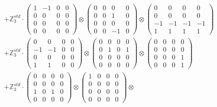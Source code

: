 \documentclass{article}
\begin{document}
{\begin{align}
        &+ \label{Rs1-Rc16-Solution-1-c4} \mathbb{Z}_3^{std} \cdot 
            \begin{pmatrix} 1 & -1 & 0 & 0 \\ 0 & 0 & 0 & 0 \\ 0 & 0 & 0 & 0 \\ 0 & 0 & 0 & 0 \end{pmatrix} \otimes 
            \begin{pmatrix} 0 & 0 & 0 & 0 \\ 0 & 0 & 1 & 0 \\ 0 & 0 & 0 & 0 \\ 0 & 0 & -1 & 0 \end{pmatrix} \otimes 
            \begin{pmatrix} 0 & 0 & 0 & 0 \\ 0 & 0 & 0 & 0 \\ -1 & -1 & -1 & -1 \\ 1 & 1 & 1 & 1 \end{pmatrix} \\ 
        &+ \label{Rs1-Rc16-Solution-1-c5} \mathbb{Z}_3^{std} \cdot 
            \begin{pmatrix} 0 & 0 & 0 & 0 \\ -1 & -1 & 0 & 0 \\ 0 & 0 & 0 & 0 \\ 1 & 1 & 0 & 0 \end{pmatrix} \otimes 
            \begin{pmatrix} 0 & 0 & 0 & 0 \\ 0 & 1 & 0 & 1 \\ 0 & 0 & 0 & 0 \\ 0 & 0 & 0 & 0 \end{pmatrix} \otimes 
            \begin{pmatrix} 0 & 0 & 0 & 0 \\ 0 & 0 & 0 & 0 \\ 0 & 0 & 0 & 1 \\ 0 & 0 & 0 & 1 \end{pmatrix} \\ 
        &+ \label{Rs1-Rc16-Solution-1-c6} \mathbb{Z}_3^{std} \cdot 
            \begin{pmatrix} 0 & 0 & 0 & 0 \\ 0 & 0 & 0 & 0 \\ 1 & 0 & 1 & 0 \\ 0 & 0 & 0 & 0 \end{pmatrix} \otimes 
            \begin{pmatrix} 1 & 0 & 0 & 0 \\ 0 & 0 & 0 & 0 \\ 0 & 0 & 0 & 0 \\ 0 & 0 & 0 & 0 \end{pmatrix} \otimes 

\end{align}}
\end{document}
